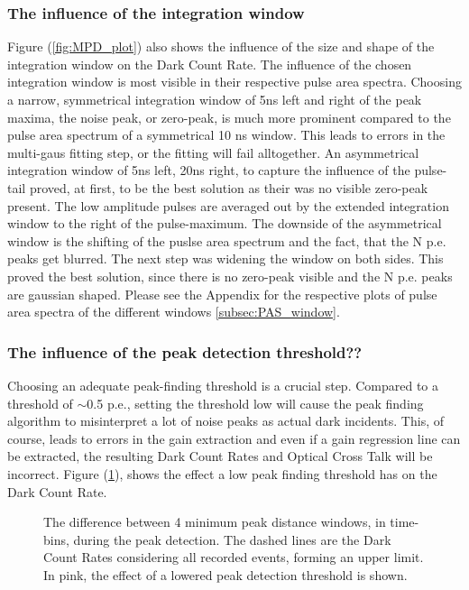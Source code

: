 \documentclass[12pt,article,type=msc,colorback,accentcolor=tud9c]{tudthesis}
\begin{document}
\subsubsection{The influence of the integration window}
Figure (\ref{fig:MPD_plot}) also shows the influence of the size and shape of the integration window on the Dark Count Rate. The influence of the chosen integration window is most visible in their respective pulse area spectra. Choosing a narrow, symmetrical integration window of 5ns left and right of the peak maxima, the noise peak, or zero-peak, is much more prominent compared to the pulse area spectrum of a symmetrical 10 ns window. This leads to errors in the multi-gaus fitting step, or the fitting will fail alltogether. An asymmetrical integration window of 5ns left, 20ns right, to capture the influence of the pulse-tail proved, at first, to be the best solution as their was no visible zero-peak present. The low amplitude pulses are averaged out by the extended integration window to the right of the pulse-maximum. The downside of the asymmetrical window is the shifting of the puslse area spectrum and the fact, that the N p.e. peaks get blurred. The next step was widening the window on both sides. This proved the best solution, since there is no zero-peak visible and the N p.e. peaks are gaussian shaped. Please see the Appendix for the respective plots of pulse area spectra of the different windows \ref{subsec:PAS_window}.

\subsubsection{The influence of the peak detection threshold??}

Choosing an adequate peak-finding threshold is a crucial step. Compared to a threshold of $\sim$0.5 p.e., setting the threshold low will cause the peak finding algorithm to misinterpret a lot of noise peaks as actual dark incidents. This, of course, leads to errors in the gain extraction and even if a gain regression line can be extracted, the resulting Dark Count Rates and Optical Cross Talk will be incorrect. Figure (\ref{fig:PF_Thresh_plot}), shows the effect a low peak finding threshold has on the Dark Count Rate.

\begin{figure}[h]
\begin{centering}
\caption{The difference between 4 minimum peak distance windows, in time-bins, during the peak detection. The dashed lines are the Dark Count Rates considering all recorded events, forming an upper limit. In pink, the effect of a lowered peak detection threshold is shown.}
\label{fig:PF_Thresh_plot}
\end{centering}
\end{figure}
\end{document}
